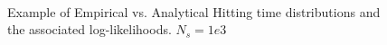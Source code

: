 \begin{figure}[h]
\begin{center}
{}
\\
\caption[labelInTOC]{Example of Empirical vs. Analytical Hitting time
distributions and the associated log-likelihoods. $N_s = 1e3$}
\label{fig:log_likelihood_beta_examples_1000}
\end{center}
\end{figure} 


